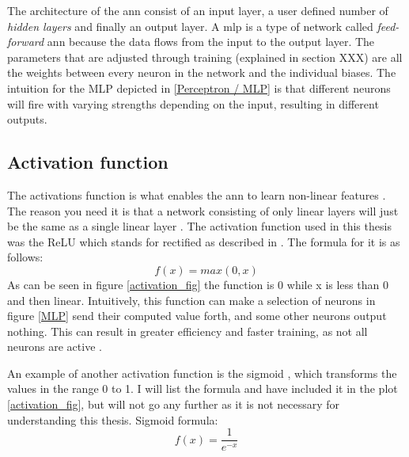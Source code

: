         The architecture of the \gls{ann} consist of an input layer, a user defined number of \textit{hidden layers} and finally an output layer. A \gls{mlp} is a type of network called \textit{feed-forward} \gls{ann} because the data flows from the input to the output layer. The parameters that are adjusted through training (explained in section XXX) are all the weights between every neuron in the network and the individual biases. The intuition for the MLP depicted in \ref{Perceptron / MLP} is that different neurons will fire with varying strengths depending on the input, resulting in different outputs.
        
    \subsection{Activation function} \label{activation function}
        The activations function is what enables the \gls{ann} to learn non-linear features \cite{razavi2021deep_exp_per}. The reason you need it is that a network consisting of only linear layers will just be the same as a single linear layer \cite{razavi2021deep_exp_per}. The activation function used in this thesis was the ReLU which stands for rectified as described in \cite{sharma2019new_activation_func}. The formula for it is as follows:
            \begin{equation} \label{relu_eq}
                f(x) = max(0,x)
            \end{equation}
        As can be seen in figure \ref{activation_fig} the function is 0 while x is less than 0 and then linear. Intuitively, this function can make a selection of neurons in figure \ref{MLP} send their computed value forth, and some  other neurons output nothing. This can result in greater efficiency and faster training, as not all neurons are active \cite{sharma2019new_activation_func}.
        
        An example of another activation function is the sigmoid \cite{sharma2019new_activation_func}, which transforms the values in the range 0 to 1. I will list the formula and have included it in the plot \ref{activation_fig}, but will not go any further as it is not necessary for understanding this thesis. Sigmoid formula:
            \begin{equation} \label{sigmoid_eq}
                f(x) = \dfrac{1}{e^{-x}} 
            \end{equation}
            

